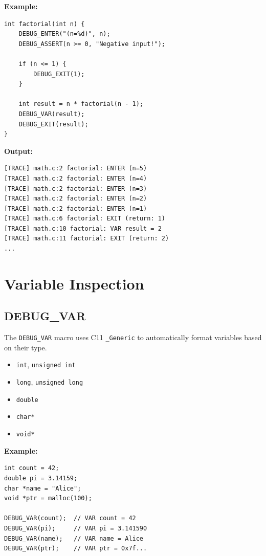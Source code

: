 \documentclass[11pt,a4paper]{article}
\begin{document}
\textbf{Example:}
\begin{lstlisting}
int factorial(int n) {
    DEBUG_ENTER("(n=%d)", n);
    DEBUG_ASSERT(n >= 0, "Negative input!");
    
    if (n <= 1) {
        DEBUG_EXIT(1);
    }
    
    int result = n * factorial(n - 1);
    DEBUG_VAR(result);
    DEBUG_EXIT(result);
}
\end{lstlisting}

\textbf{Output:}
\begin{verbatim}
[TRACE] math.c:2 factorial: ENTER (n=5)
[TRACE] math.c:2 factorial: ENTER (n=4)
[TRACE] math.c:2 factorial: ENTER (n=3)
[TRACE] math.c:2 factorial: ENTER (n=2)
[TRACE] math.c:2 factorial: ENTER (n=1)
[TRACE] math.c:6 factorial: EXIT (return: 1)
[TRACE] math.c:10 factorial: VAR result = 2
[TRACE] math.c:11 factorial: EXIT (return: 2)
...
\end{verbatim}

\section{Variable Inspection}

\subsection{DEBUG\_VAR}

The \texttt{DEBUG\_VAR} macro uses C11 \texttt{\_Generic} to automatically format variables based on their type.

\begin{tcolorbox}[title=Supported Types]
\begin{itemize}[noitemsep]
    \item \texttt{int}, \texttt{unsigned int}
    \item \texttt{long}, \texttt{unsigned long}
    \item \texttt{double}
    \item \texttt{char*}
    \item \texttt{void*}
\end{itemize}
\end{tcolorbox}

\textbf{Example:}
\begin{lstlisting}
int count = 42;
double pi = 3.14159;
char *name = "Alice";
void *ptr = malloc(100);

DEBUG_VAR(count);  // VAR count = 42
DEBUG_VAR(pi);     // VAR pi = 3.141590
DEBUG_VAR(name);   // VAR name = Alice
DEBUG_VAR(ptr);    // VAR ptr = 0x7f...
\end{lstlisting}
\end{document}
